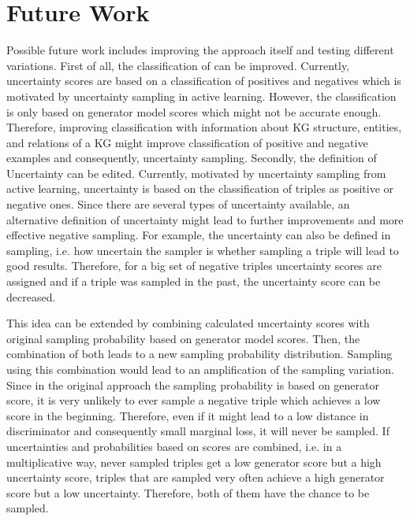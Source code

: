 \section{Future Work} 
\label{sec:futurework}
%
Possible future work includes improving the \usgan approach itself and testing different variations.
First of all, the classification of \usgan can be improved.
Currently, uncertainty scores are based on a classification of positives and negatives which is motivated by uncertainty sampling in active learning.
However, the classification is only based on generator model scores which might not be accurate enough.
Therefore, improving classification with information about \ac{KG} structure, entities, and relations of a \ac{KG} might improve classification of positive and negative examples and consequently, uncertainty sampling.
Secondly, the definition of Uncertainty can be edited.
Currently, motivated by uncertainty sampling from active learning, uncertainty is based on the classification of triples as positive or negative ones.
Since there are several types of uncertainty available, an alternative definition of uncertainty might lead to further improvements and more effective negative sampling.
For example, the uncertainty can also be defined in sampling, i.e. how uncertain the sampler is whether sampling a triple will lead to good results.
Therefore, for a big set of negative triples uncertainty scores are assigned and if a triple was sampled in the past, the uncertainty score can be decreased.

This idea can be extended by combining calculated uncertainty scores with original sampling probability based on generator model scores.
Then, the combination of both leads to a new sampling probability distribution.
Sampling using this combination would lead to an amplification of the sampling variation.
Since in the original approach the sampling probability is based on generator score, it is very unlikely to ever sample a negative triple which achieves a low score in the beginning.
Therefore, even if it might lead to a low distance in discriminator and consequently small marginal loss, it will never be sampled.
If uncertainties and probabilities based on scores are combined, i.e. in a multiplicative way, never sampled triples get a low generator score but a high uncertainty score, triples that are sampled very often achieve a high generator score but a low uncertainty.
Therefore, both of them have the chance to be sampled.

